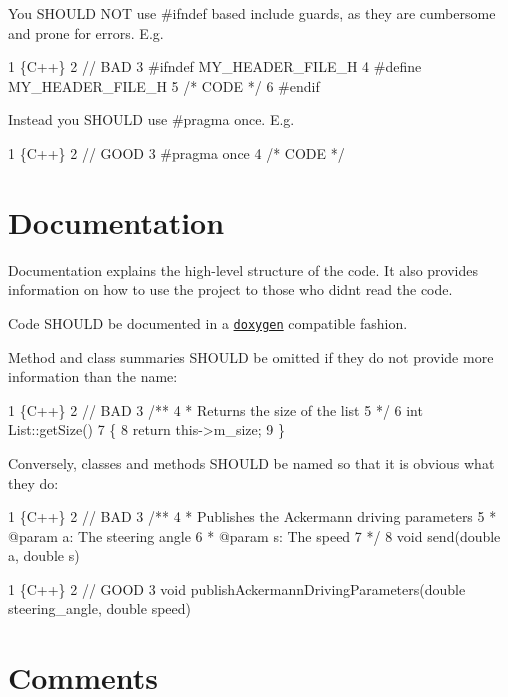 You S\+H\+O\+U\+LD N\+OT use {\ttfamily \#ifndef} based include guards, as they are cumbersome and prone for errors. E.\+g. 
\begin{DoxyCode}
1 \{C++\}
2 // BAD
3 #ifndef MY\_HEADER\_FILE\_H
4 #define MY\_HEADER\_FILE\_H
5 /* CODE */
6 #endif
\end{DoxyCode}
 Instead you S\+H\+O\+U\+LD use {\ttfamily \#pragma once}. E.\+g. 
\begin{DoxyCode}
1 \{C++\}
2 // GOOD
3 #pragma once
4 /* CODE */
\end{DoxyCode}


\section*{Documentation}

Documentation explains the high-\/level structure of the code. It also provides information on how to use the project to those who didn\textquotesingle{}t read the code.

Code S\+H\+O\+U\+LD be documented in a \href{http://www.doxygen.nl/manual/docblocks.html}{\tt doxygen} compatible fashion.

Method and class summaries S\+H\+O\+U\+LD be omitted if they do not provide more information than the name\+:


\begin{DoxyCode}
1 \{C++\}
2 // BAD
3 /**
4  *  Returns the size of the list
5  */
6 int List::getSize()
7 \{
8     return this->m\_size;
9 \}
\end{DoxyCode}


Conversely, classes and methods S\+H\+O\+U\+LD be named so that it is obvious what they do\+:


\begin{DoxyCode}
1 \{C++\}
2 // BAD
3 /**
4  *   Publishes the Ackermann driving parameters
5  *   @param a: The steering angle
6  *   @param s: The speed
7  */
8 void send(double a, double s)
\end{DoxyCode}



\begin{DoxyCode}
1 \{C++\}
2 // GOOD
3 void publishAckermannDrivingParameters(double steering\_angle, double speed)
\end{DoxyCode}


\section*{Comments}

